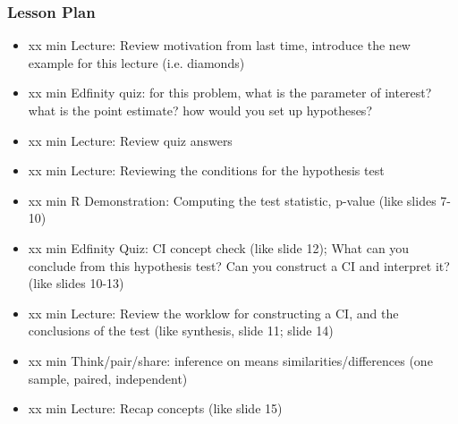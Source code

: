 \begin{frame}
    \frametitle{Lesson Plan}
    \begin{itemize}
        \item xx min Lecture: Review motivation from last time, introduce the new example for this lecture (i.e. diamonds)
        \item xx min Edfinity quiz: for this problem, what is the parameter of interest? what is the point estimate? how would you set up hypotheses?
        \item xx min Lecture: Review quiz answers
        \item xx min Lecture: Reviewing the conditions for the hypothesis test %
        \item xx min R Demonstration: Computing the test statistic, p-value (like slides 7-10)
        \item xx min Edfinity Quiz: CI concept check (like slide 12); What can you conclude from this hypothesis test? Can you construct a CI and interpret it? (like slides 10-13)
        \item xx min Lecture: Review the worklow for constructing a CI, and the conclusions of the test (like synthesis, slide 11; slide 14) 
        \item xx min Think/pair/share: inference on means similarities/differences (one sample, paired, independent) 
        \item xx min Lecture: Recap concepts (like slide 15)
    \end{itemize}
\end{frame}

